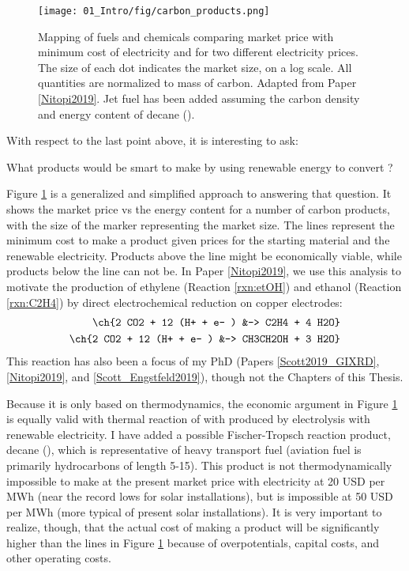\begin{figure}[b!]
	\centering
	\texttt{[image: 01\_Intro/fig/carbon\_products.png]}
	\caption{Mapping of fuels and chemicals comparing market price with minimum cost of electricity and  for two different electricity prices. The size of each dot indicates the market size, on a log scale. All quantities are normalized to mass of carbon. Adapted from Paper \ref{Nitopi2019}. Jet fuel has been added assuming the carbon density and energy content of decane ().}
	\label{fig:products}
\end{figure}

With respect to the last point above, it is interesting to ask: 
\begin{question}
	What products would be smart to make by using renewable energy to convert ?
\end{question}
Figure \ref{fig:products} is a generalized and simplified approach to answering that question. It shows the market price vs the energy content for a number of carbon products, with the size of the marker representing the market size. The lines represent the minimum cost to make a product given prices for the  starting material and the renewable electricity. Products above the line might be economically viable, while products below the line can not be. In Paper \ref{Nitopi2019}, we use this analysis to motivate the production of ethylene (Reaction \ref{rxn:etOH}) and ethanol (Reaction \ref{rxn:C2H4}) by direct electrochemical  reduction on copper electrodes:
\begin{align}
\ch{2 CO2 + 12 (H+ + e- ) &-> C2H4 + 4 H2O}\label{rxn:etOH}\\
\ch{2 CO2 + 12 (H+ + e- ) &-> CH3CH2OH + 3 H2O}\label{rxn:C2H4}
\end{align}
This reaction has also been a focus of my PhD (Papers \ref{Scott2019_GIXRD}, \ref{Nitopi2019}, and \ref{Scott_Engstfeld2019}), though not the Chapters of this Thesis.

Because it is only based on thermodynamics, the economic argument in Figure \ref{fig:products} is equally valid with thermal reaction of  with  produced by electrolysis with renewable electricity. I have added a possible Fischer-Tropsch reaction product, decane (), which is representative of heavy transport fuel (aviation fuel is primarily hydrocarbons of length 5-15). This product is not thermodynamically impossible to make at the present market price with electricity at 20 USD per MWh (near the record lows for solar installations), but is impossible at 50 USD per MWh (more typical of present solar installations). It is very important to realize, though, that the actual cost of making a product will be significantly higher than the lines in Figure \ref{fig:products} because of overpotentials, capital costs, and other operating costs.

